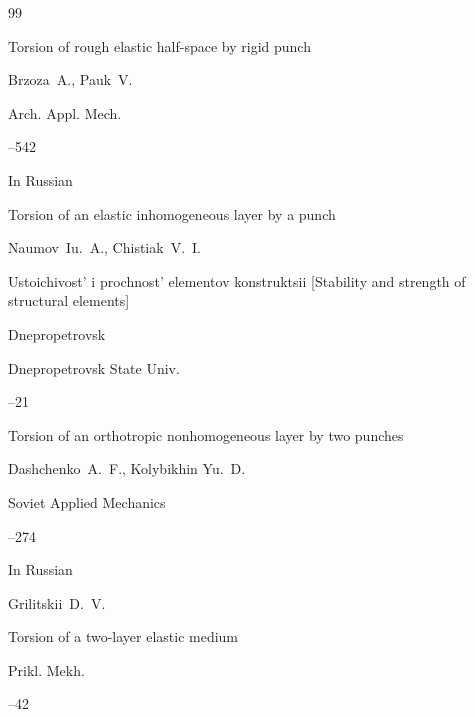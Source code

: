 \begin{thebibliography}{99}

\paper Torsion of rough elastic half-space by rigid punch

\by Brzoza~A., Pauk~V. 

\jour Arch. Appl. Mech. 




--542





\lang In Russian

\paper Torsion of an elastic  inhomogeneous layer by a punch

\by Naumov~Iu.~A., Chistiak~V.~I. 

\inbook Ustoichivost' i prochnost' elementov konstruktsii  \rm [Stability and strength of structural elements]

\publaddr Dnepropetrovsk 

\publ Dnepropetrovsk State Univ.


--21






\paper Torsion of an orthotropic nonhomogeneous layer by two punches 

\by Dashchenko~A.~F., Kolybikhin Yu.~D. 

\jour Soviet Applied Mechanics 




--274





\lang In Russian

\by Grilitskii~D.~V.

\paper Torsion of a two-layer elastic medium

\jour Prikl. Mekh. 




--42




\end{thebibliography}

